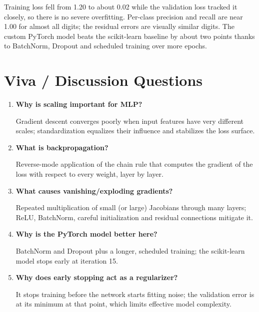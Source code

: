 Training loss fell from 1.20 to about 0.02 while the validation loss tracked it closely, so
there is no severe overfitting. Per-class precision and recall are near 1.00 for almost all
digits; the residual errors are visually similar digits. The custom PyTorch model beats the
scikit-learn baseline by about two points thanks to BatchNorm, Dropout and scheduled training
over more epochs.

\section{Viva / Discussion Questions}
\begin{enumerate}
  \item \textbf{Why is scaling important for MLP?}\par\nobreak Gradient descent converges poorly when input
  features have very different scales; standardization equalizes their influence and stabilizes
  the loss surface.
  \item \textbf{What is backpropagation?}\par\nobreak Reverse-mode application of the chain rule that computes the
  gradient of the loss with respect to every weight, layer by layer.
  \item \textbf{What causes vanishing/exploding gradients?}\par\nobreak Repeated multiplication of small (or
  large) Jacobians through many layers; ReLU, BatchNorm, careful initialization and residual
  connections mitigate it.
  \item \textbf{Why is the PyTorch model better here?}\par\nobreak BatchNorm and Dropout plus a longer, scheduled
  training; the scikit-learn model stops early at iteration 15.
\item \textbf{Why does early stopping act as a regularizer?}\par\nobreak It stops training before the network starts fitting noise; the validation error is at its minimum at that point, which limits effective model complexity.
\end{enumerate}

